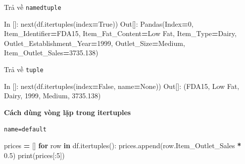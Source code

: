 \documentclass[
]{book}
\newenvironment{Shaded}{\begin{snugshade}}{\end{snugshade}}
\newcommand{\BuiltInTok}[1]{#1}
\newcommand{\ControlFlowTok}[1]{\textcolor[rgb]{0.13,0.29,0.53}{\textbf{#1}}}
\newcommand{\DecValTok}[1]{\textcolor[rgb]{0.00,0.00,0.81}{#1}}
\newcommand{\FloatTok}[1]{\textcolor[rgb]{0.00,0.00,0.81}{#1}}
\newcommand{\KeywordTok}[1]{\textcolor[rgb]{0.13,0.29,0.53}{\textbf{#1}}}
\newcommand{\NormalTok}[1]{#1}
\newcommand{\OperatorTok}[1]{\textcolor[rgb]{0.81,0.36,0.00}{\textbf{#1}}}
\newcommand{\StringTok}[1]{\textcolor[rgb]{0.31,0.60,0.02}{#1}}
\newcommand{\VariableTok}[1]{\textcolor[rgb]{0.00,0.00,0.00}{#1}}
\begin{document}
Trả về \texttt{namedtuple}

\begin{Shaded}
\begin{Highlighting}[]
\NormalTok{In []: }\BuiltInTok{next}\NormalTok{(df.itertuples(index}\OperatorTok{=}\VariableTok{True}\NormalTok{))}
\NormalTok{Out[]:}
\NormalTok{Pandas(Index}\OperatorTok{=}\DecValTok{0}\NormalTok{, Item\_Identifier}\OperatorTok{=}\StringTok{\textquotesingle{}FDA15\textquotesingle{}}\NormalTok{, Item\_Fat\_Content}\OperatorTok{=}\StringTok{\textquotesingle{}Low Fat\textquotesingle{}}\NormalTok{, Item\_Type}\OperatorTok{=}\StringTok{\textquotesingle{}Dairy\textquotesingle{}}\NormalTok{, Outlet\_Establishment\_Year}\OperatorTok{=}\DecValTok{1999}\NormalTok{, Outlet\_Size}\OperatorTok{=}\StringTok{\textquotesingle{}Medium\textquotesingle{}}\NormalTok{, Item\_Outlet\_Sales}\OperatorTok{=}\FloatTok{3735.138}\NormalTok{)}
\end{Highlighting}
\end{Shaded}

Trả về \texttt{tuple}

\begin{Shaded}
\begin{Highlighting}[]
\NormalTok{In []: }\BuiltInTok{next}\NormalTok{(df.itertuples(index}\OperatorTok{=}\VariableTok{False}\NormalTok{, name}\OperatorTok{=}\VariableTok{None}\NormalTok{))}
\NormalTok{Out[]:}
\NormalTok{(}\StringTok{\textquotesingle{}FDA15\textquotesingle{}}\NormalTok{, }\StringTok{\textquotesingle{}Low Fat\textquotesingle{}}\NormalTok{, }\StringTok{\textquotesingle{}Dairy\textquotesingle{}}\NormalTok{, }\DecValTok{1999}\NormalTok{, }\StringTok{\textquotesingle{}Medium\textquotesingle{}}\NormalTok{, }\FloatTok{3735.138}\NormalTok{)}
\end{Highlighting}
\end{Shaded}

\textbf{Cách dùng vòng lặp trong itertuples}

\texttt{name=default}

\begin{Shaded}
\begin{Highlighting}[]
\NormalTok{prices }\OperatorTok{=}\NormalTok{ []}
\ControlFlowTok{for}\NormalTok{ row }\KeywordTok{in}\NormalTok{ df.itertuples():}
\NormalTok{    prices.append(row.Item\_Outlet\_Sales }\OperatorTok{*} \FloatTok{0.5}\NormalTok{)}
\BuiltInTok{print}\NormalTok{(prices[:}\DecValTok{5}\NormalTok{])}
\end{Highlighting}
\end{Shaded}
\end{document}
